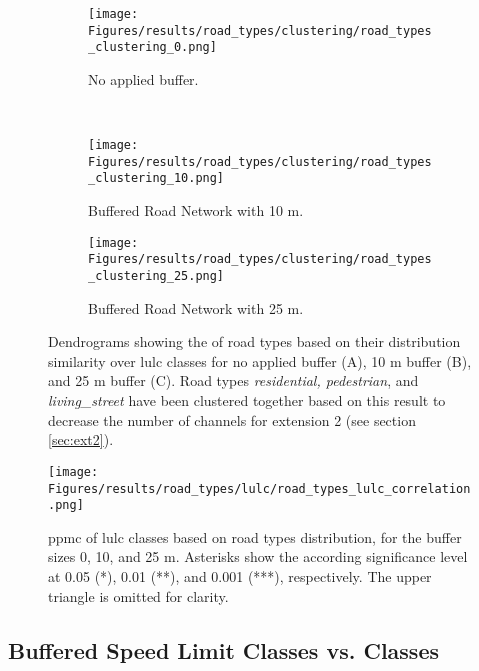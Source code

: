 \begin{figure}[!htb]
    \centering
    \begin{subfigure}{.5\textwidth}
        \centering
        \texttt{[image: Figures/results/road\_types/clustering/road\_types\_clustering\_0.png]}
        \caption{No applied buffer.}
    \end{subfigure}
    \\
    \begin{adjustbox}{center}
        \begin{subfigure}{.5\textwidth}
            \centering
            \texttt{[image: Figures/results/road\_types/clustering/road\_types\_clustering\_10.png]}
            \caption{Buffered Road Network with 10 m.}
        \end{subfigure}
        \begin{subfigure}{.5\textwidth}
            \centering
            \texttt{[image: Figures/results/road\_types/clustering/road\_types\_clustering\_25.png]}
            \caption{Buffered Road Network with 25 m.}
        \end{subfigure}
    \end{adjustbox}
    \caption[]{Dendrograms showing the  of road types based on their distribution similarity over \gls{lulc} classes for no applied buffer (A), 10 m buffer (B), and 25 m buffer (C). Road types \emph{residential, pedestrian}, and \emph{living\_street} have been clustered together based on this result to decrease the number of channels for extension 2 (see section \ref{sec:ext2}).}
    \label{app_fig:types_dendrograms}
\end{figure}

\clearpage

\begin{figure}[htb]
    \centering
    \texttt{[image: Figures/results/road\_types/lulc/road\_types\_lulc\_correlation.png]}
    \caption[ of  Classes Based on Buffered Road Types]{\gls{ppmc} of \gls{lulc} classes based on road types distribution, for the buffer sizes 0, 10, and 25 m. Asterisks show the according significance level at 0.05 (*), 0.01 (**), and 0.001 (***), respectively. The upper triangle is omitted for clarity.}
    \label{app_fig:types_correlation}
\end{figure}


\clearpage

\subsection{Buffered Speed Limit Classes vs.  Classes}
\label{app:speeds}

